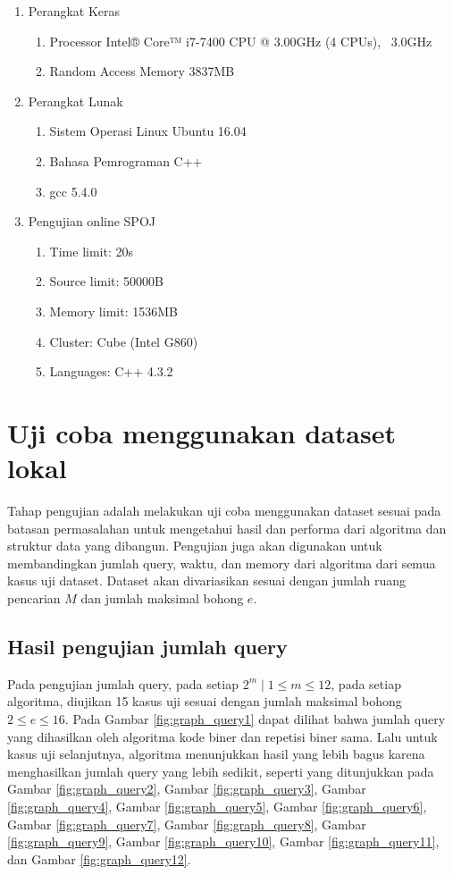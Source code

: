 \begin{enumerate}
  \item Perangkat Keras
  \begin{enumerate}
    \item Processor Intel® Core™ i7-7400 CPU @ 3.00GHz (4 CPUs), ~3.0GHz
    \item Random Access Memory 3837MB
  \end{enumerate}
  \item Perangkat Lunak
  \begin{enumerate}
    \item Sistem Operasi Linux Ubuntu 16.04
    \item Bahasa Pemrograman C++
    \item gcc 5.4.0
  \end{enumerate}
  \item Pengujian online SPOJ
  \begin{enumerate}
    \item Time limit: 20s
    \item Source limit: 50000B
    \item Memory limit: 1536MB
    \item Cluster: Cube (Intel G860)
    \item Languages: C++ 4.3.2
  \end{enumerate}
\end{enumerate}

\section{Uji coba menggunakan dataset lokal}

Tahap pengujian adalah melakukan uji coba menggunakan dataset sesuai pada batasan permasalahan untuk mengetahui hasil dan performa dari algoritma dan struktur data yang dibangun. Pengujian juga akan digunakan untuk membandingkan jumlah query, waktu, dan memory dari algoritma dari semua kasus uji dataset. Dataset akan divariasikan sesuai dengan jumlah ruang pencarian $M$ dan jumlah maksimal bohong $e$.

\subsection{Hasil pengujian jumlah query}

Pada pengujian jumlah query, pada setiap $2^m \mid 1 \leq m \leq 12$, pada setiap algoritma, diujikan 15 kasus uji sesuai dengan jumlah maksimal bohong $2 \leq e \leq 16$. Pada Gambar \ref{fig:graph_query1} dapat dilihat bahwa jumlah query yang dihasilkan oleh algoritma kode biner dan repetisi biner sama. Lalu untuk kasus uji selanjutnya, algoritma menunjukkan hasil yang lebih bagus karena menghasilkan jumlah query yang lebih sedikit, seperti yang ditunjukkan pada Gambar \ref{fig:graph_query2}, Gambar \ref{fig:graph_query3}, Gambar \ref{fig:graph_query4}, Gambar \ref{fig:graph_query5}, Gambar \ref{fig:graph_query6}, Gambar \ref{fig:graph_query7}, Gambar \ref{fig:graph_query8}, Gambar \ref{fig:graph_query9}, Gambar \ref{fig:graph_query10}, Gambar \ref{fig:graph_query11}, dan Gambar \ref{fig:graph_query12}.

